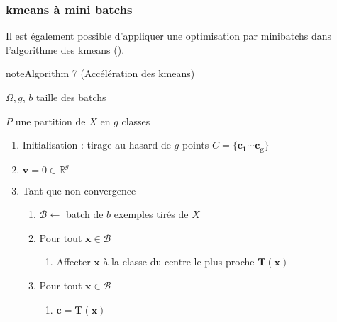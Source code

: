 \documentclass[letterpaper,10pt,english]{jupyterBook}
\begin{document}
\subsubsection{k\sphinxhyphen{}means à mini batchs}
\label{\detokenize{clustering:k-means-a-mini-batchs}}
\sphinxAtStartPar
Il est également possible d’appliquer une optimisation par mini\sphinxhyphen{}batchs dans l’algorithme des k\sphinxhyphen{}means ({\hyperref[\detokenize{clustering:kmbatch}]{}}).
\label{clustering:kmbatch}
\begin{sphinxadmonition}{note}{Algorithm 7 (Accélération des k\sphinxhyphen{}means)}



\sphinxAtStartPar
{} \(\Omega, g\), \(b\) taille des batchs

\sphinxAtStartPar
{} \(P\) une partition de \(X\) en \(g\) classes
\begin{enumerate}
%
\item {} 
\sphinxAtStartPar
Initialisation : tirage au hasard de \(g\) points \(C =\{\mathbf {c_1}\cdots \mathbf {c_g\}}\)

\item {} 
\sphinxAtStartPar
\(\mathbf v=0\in\mathbb{R}^g\)

\item {} 
\sphinxAtStartPar
Tant que non convergence
\begin{enumerate}
%
\item {} 
\sphinxAtStartPar
\(\mathcal{B}\leftarrow\) batch de \(b\) exemples tirés de \(X\)

\item {} 
\sphinxAtStartPar
Pour tout \(\mathbf x\in \mathcal{B}\)
\begin{enumerate}
%
\item {} 
\sphinxAtStartPar
Affecter \(\mathbf x\) à la classe du centre le plus proche \(\mathbf T(\mathbf x)\)

\end{enumerate}

\item {} 
\sphinxAtStartPar
Pour tout \(\mathbf x\in \mathcal{B}\)
\begin{enumerate}
%
\item {} 
\sphinxAtStartPar
\(\mathbf c = \mathbf T(\mathbf x)\)


\end{enumerate}
\end{enumerate}
\end{enumerate}
\end{sphinxadmonition}
\end{document}
